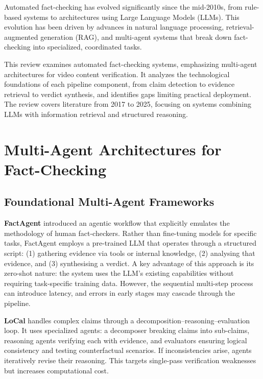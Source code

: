 \documentclass[12pt,a4paper]{article}
\begin{document}
Automated fact-checking has evolved significantly since the mid-2010s, from rule-based systems to architectures using Large Language Models (LLMs). This evolution has been driven by advances in natural language processing, retrieval-augmented generation (RAG), and multi-agent systems that break down fact-checking into specialized, coordinated tasks.

This review examines automated fact-checking systems, emphasizing multi-agent architectures for video content verification. It analyzes the technological foundations of each pipeline component, from claim detection to evidence retrieval to verdict synthesis, and identifies gaps limiting practical deployment. The review covers literature from 2017 to 2025, focusing on systems combining LLMs with information retrieval and structured reasoning.

\section{Multi-Agent Architectures for Fact-Checking}

\subsection{Foundational Multi-Agent Frameworks}

\textbf{FactAgent} \citep{hysonlab2025factagent} introduced an agentic workflow that explicitly emulates the methodology of human fact-checkers. Rather than fine-tuning models for specific tasks, FactAgent employs a pre-trained LLM that operates through a structured script: (1) gathering evidence via tools or internal knowledge, (2) analysing that evidence, and (3) synthesising a verdict. A key advantage of this approach is its zero-shot nature: the system uses the LLM's existing capabilities without requiring task-specific training data. However, the sequential multi-step process can introduce latency, and errors in early stages may cascade through the pipeline.

\textbf{LoCal} \citep{chen2024local} handles complex claims through a decomposition–reasoning–evaluation loop. It uses specialized agents: a decomposer breaking claims into sub-claims, reasoning agents verifying each with evidence, and evaluators ensuring logical consistency and testing counterfactual scenarios. If inconsistencies arise, agents iteratively revise their reasoning. This targets single-pass verification weaknesses but increases computational cost.
\end{document}
